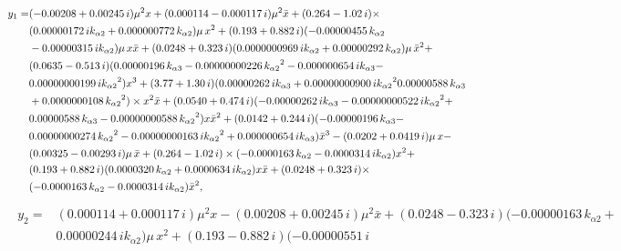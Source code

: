 \documentclass[openacc]{rsproca_new}%
\begin{document}
\begin{appendices}
\begin{align}
\begin{split}
  y_1=&( - 0.00208+ 0.00245\,i ) { \mu}^{2}x+ (  0.000114-
  0.000117\,i ) { \mu}^{2}\bar {x}+ (  0.264- 1.02\,i ) \times\\
  &(  0.00000172\,i{  k_{\alpha 2}}+ 0.000000772\,{  k_{\alpha 2}} )  \mu\,{
  x}^{2}+ (  0.193+ 0.882\,i )  ( - 0.00000455\,{  k_{\alpha 2}
  }\\
  &- 0.00000315\,i{  k_{\alpha 2}} )  \mu\,x\bar {x}+(  0.0248+ 0.323\,i)
  (  0.0000000969\,i{  k_{\alpha 2}}+ 0.00000292\,{  k_{\alpha 2}}
  )  \mu\,{\bar {x}}^{2}+\\
& (  0.0635- 0.513\,i )  (
  0.00000196\,{  k_{\alpha 3}}- 0.00000000226\,{{  k_{\alpha 2}}}^{2}- 0.000000654\,i
  {  k_{\alpha 3}}-\\
& 0.00000000199\,i{{  k_{\alpha 2}}}^{2} ) {x}^{3}+   (
  3.77+ 1.30\,i )  (  0.00000262\,i{  k_{\alpha 3}}+ 0.00000000900
  \,i{{  k_{\alpha 2}}}^{2}\-0.00000588\,{  k_{\alpha 3}}\\&+ 0.0000000108\,{{  k_{\alpha 2}}}^{
  2} ) \times
  {x}^{2}\bar {x}+ (  0.0540+ 0.474\,i )  ( -
  0.00000262\,i{  k_{\alpha 3}}- 0.00000000522\,i{{  k_{\alpha 2}}}^{2}+ \\
  & 0.00000588\,
  {  k_{\alpha 3}}-0.00000000588\,{{  k_{\alpha 2}}}^{2} )x{\bar {x}}^{2}+(
  0.0142+ 0.244\,i )  ( - 0.00000196\,{  k_{\alpha 3}}-
  \\&0.00000000274\,{{  k_{\alpha 2}}}^{2}- 0.00000000163\,i{{  k_{\alpha 2}}}^{2}+
  0.000000654\,i{  k_{\alpha 3}} ) {\bar {x}}^{3}- (  0.0202+ 0.0419\,i
  )  \mu\,x-\\& (  0.00325- 0.00293\,i )  \mu\,\bar {x}+ (
  0.264- 1.02\,i ) \times  ( - 0.0000163\,{  k_{\alpha 2}}- 0.0000314\,i{
    k_{\alpha 2}} ) {x}^{2}+ \\&(  0.193+ 0.882\,i )  (
  0.0000320\,{  k_{\alpha 2}}+ 0.0000634\,i{  k_{\alpha 2}} ) x\bar {x}+(0.0248+ 0.323\,i )\times  \\&( - 0.0000163\,{  k_{\alpha 2}}- 0.0000314\,i
 {  k_{\alpha 2}} ) {\bar {x}}^{2},
\end{split}
\end{align}
\begin{align}
\begin{split}
  y_2=&(  0.000114+ 0.000117\,i ) {\mu}^{2}x- (  0.00208+
  0.00245\,i ) {\mu}^{2}\bar x+ (  0.0248- 0.323\,i )
  ( - 0.00000163\,{k_{\alpha 2}}+\\
   &0.00000244\,i{k_{\alpha 2}} ) \mu\,{
  x}^{2}+ (  0.193- 0.882\,i )  ( - 0.00000551\,i{
}
\end{split}
\end{align}
\end{appendices}
\end{document}

